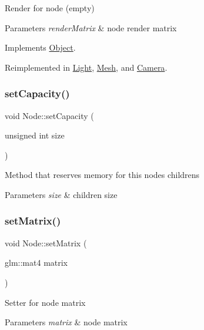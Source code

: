 Render for node (empty) 
\begin{DoxyParams}{Parameters}
{\em render\+Matrix} & node render matrix \\
\hline
\end{DoxyParams}


Implements \hyperlink{classObject_af7b5e6c789269f331688537c0809fb82}{Object}.



Reimplemented in \hyperlink{classLight_a069c6888b42eca238328d79b03c3a411}{Light}, \hyperlink{classMesh_a4d69d0cadc7f4c10d7b30b19ee1220cc}{Mesh}, and \hyperlink{classCamera_adb0f3d1a0119a86ca7d68e54468b8eef}{Camera}.

\mbox{\label{classNode_a7665075c56908bb07657ee0ed2f25dfb}} 
\subsubsection{\texorpdfstring{set\+Capacity()}{setCapacity()}}
{\footnotesize\ttfamily void Node\+::set\+Capacity (\begin{DoxyParamCaption}\item[{unsigned int}]{size }\end{DoxyParamCaption})}

Method that reserves memory for this node\textquotesingle{}s childrens 
\begin{DoxyParams}{Parameters}
{\em size} & children size \\
\hline
\end{DoxyParams}
\mbox{\label{classNode_a19426bb52ce3ea720ff70138f9af8e59}} 
\subsubsection{\texorpdfstring{set\+Matrix()}{setMatrix()}}
{\footnotesize\ttfamily void Node\+::set\+Matrix (\begin{DoxyParamCaption}\item[{glm\+::mat4}]{matrix }\end{DoxyParamCaption})}

Setter for node matrix 
\begin{DoxyParams}{Parameters}
{\em matrix} & node matrix \\
\hline
\end{DoxyParams}
\mbox{\label{classNode_ab5f0786bcb59591c528efb0b776797fc}} 
